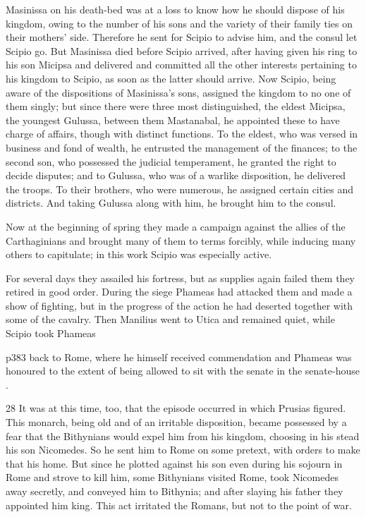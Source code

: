 Masinissa on his death-bed was at a loss to know how he should dispose of his kingdom, owing to the number of his sons and the variety of their family ties on their mothers' side. Therefore he sent for Scipio to advise him, and the consul let Scipio go. But Masinissa died before Scipio arrived, after having given his ring to his son Micipsa and delivered and committed all the other interests pertaining to his kingdom to Scipio, as soon as the latter should arrive. Now Scipio, being aware of the dispositions of Masinissa's sons, assigned the kingdom to no one of them singly; but since there were three most distinguished, the eldest Micipsa, the youngest Gulussa, between them Mastanabal, he appointed these to have charge of affairs, though with distinct functions. To the eldest, who was versed in business and fond of wealth, he entrusted the management of the finances; to the second son, who possessed the judicial temperament, he granted the right to decide disputes; and to Gulussa, who was of a warlike disposition, he delivered the troops. To their brothers, who were numerous, he assigned certain cities and districts. And taking Gulussa along with him, he brought him to the consul.

Now at the beginning of spring they made a campaign against the allies of the Carthaginians and brought many of them to terms forcibly, while indu­cing many others to capitulate; in this work Scipio was especially active.

For several days they assailed his fortress, but as supplies again failed them they retired in good order. During the siege Phameas had attacked them and made a show of fighting, but in the progress of the action he had deserted together with some of the cavalry. Then Manilius went to Utica and remained quiet, while Scipio took Phameas

p383 back to Rome, where he himself received commendation and Phameas was honoured to the extent of being allowed to sit with the senate in the senate-house .

28
It was at this time, too, that the episode occurred in which Prusias figured. This monarch, being old and of an irritable disposition, became possessed by a fear that the Bithynians would expel him from his kingdom, choosing in his stead his son Nicomedes. So he sent him to Rome on some pretext, with orders to make that his home. But since he plotted against his son even during his sojourn in Rome and strove to kill him, some Bithynians visited Rome, took Nicomedes away secretly, and conveyed him to Bithynia; and after slaying his father they appointed him king. This act irritated the Romans, but not to the point of war.

